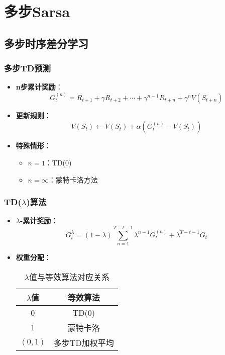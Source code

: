 \section{多步Sarsa}
\subsection{多步时序差分学习}
\subsubsection{多步TD预测}
\begin{itemize}
    \item \textbf{n步累计奖励}：
        \[
        G_t^{(n)} = R_{t+1} + \gamma R_{t+2} + \cdots + \gamma^{n-1}R_{t+n} + \gamma^n V(S_{t+n})
        \]
    \item \textbf{更新规则}：
        \[
        V(S_t) \leftarrow V(S_t) + \alpha \left( G_t^{(n)} - V(S_t) \right)
        \]
    \item \textbf{特殊情形}：
        \begin{itemize}
            \item $n=1$：TD(0)
            \item $n=\infty$：蒙特卡洛方法
        \end{itemize}
\end{itemize}

\subsubsection{TD($\lambda$)算法}
\begin{itemize}
    \item \textbf{$\lambda$-累计奖励}：
        \[
        G_t^\lambda = (1-\lambda)\sum_{n=1}^{T-t-1}\lambda^{n-1}G_t^{(n)} + \lambda^{T-t-1}G_t
        \]
    \item \textbf{权重分配}：
        \begin{center}
            \begin{table}[H]  %
                \centering
                \caption{$\lambda$值与等效算法对应关系}
                    \begin{tabular}{cc}
                    \toprule
                    $\lambda$值 & 等效算法 \\
                    \midrule
                    0 & TD(0) \\
                    1 & 蒙特卡洛 \\
                    $(0,1)$ & 多步TD加权平均 \\
                    \bottomrule
                    \end{tabular}
            \end{table}
        \end{center}
\end{itemize}

